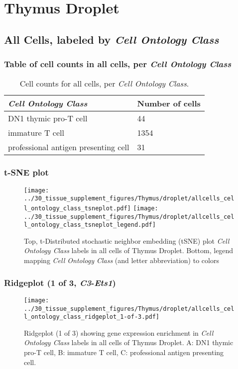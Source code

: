 \clearpage
\section{Thymus Droplet}

\subsection{All Cells, labeled by \emph{Cell Ontology Class}}
\subsubsection{Table of cell counts in all cells, per \emph{Cell Ontology Class}}\begin{table}[h]
\centering
\label{my-label}
\begin{tabular}{@{}ll@{}}
\toprule

\emph{Cell Ontology Class}& Number of cells \\ \midrule
DN1 thymic pro-T cell & 44 \\

immature T cell & 1354 \\

professional antigen presenting cell & 31 \\
\bottomrule
\end{tabular}
\caption{Cell counts for all cells, per \emph{Cell Ontology Class}.}
\end{table}

\clearpage
\subsubsection{t-SNE plot}
\begin{figure}[h]
\centering
\texttt{[image: ../30\_tissue\_supplement\_figures/Thymus/droplet/allcells\_cell\_ontology\_class\_tsneplot.pdf]}
\texttt{[image: ../30\_tissue\_supplement\_figures/Thymus/droplet/allcells\_cell\_ontology\_class\_tsneplot\_legend.pdf]}
\caption{Top, t-Distributed stochastic neighbor embedding (tSNE) plot  \emph{Cell Ontology Class} labels in all cells of Thymus Droplet. Bottom, legend mapping \emph{Cell Ontology Class} (and letter abbreviation) to colors}
\end{figure}


\clearpage

\subsubsection{Ridgeplot (1 of 3, \emph{C3}-\emph{Ets1})}
\begin{figure}[h]
\centering
\texttt{[image: ../30\_tissue\_supplement\_figures/Thymus/droplet/allcells\_cell\_ontology\_class\_ridgeplot\_1-of-3.pdf]}

\caption{ Ridgeplot (1 of 3)  showing gene expression enrichment in \emph{Cell Ontology Class} labels in all cells of Thymus Droplet. A: DN1 thymic pro-T cell, B: immature T cell, C: professional antigen presenting cell.}
\end{figure}


